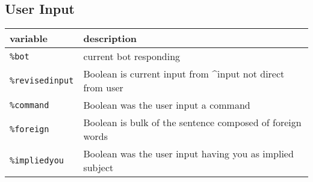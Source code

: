 \documentclass[]{article}
\begin{document}
\subsection{User Input}\label{user-input}

\begin{longtable}[]{@{}ll@{}}
\toprule
\begin{minipage}[b]{0.12\columnwidth}\raggedright\strut
variable\strut
\end{minipage} & \begin{minipage}[b]{0.10\columnwidth}\raggedright\strut
description\strut
\end{minipage}\tabularnewline
\midrule
\endhead
\begin{minipage}[t]{0.12\columnwidth}\raggedright\strut
\texttt{\%bot}\strut
\end{minipage} & \begin{minipage}[t]{0.10\columnwidth}\raggedright\strut
current bot responding\strut
\end{minipage}\tabularnewline
\begin{minipage}[t]{0.12\columnwidth}\raggedright\strut
\texttt{\%revisedinput}\strut
\end{minipage} & \begin{minipage}[t]{0.10\columnwidth}\raggedright\strut
Boolean is current input from \^{}input not direct from user\strut
\end{minipage}\tabularnewline
\begin{minipage}[t]{0.12\columnwidth}\raggedright\strut
\texttt{\%command}\strut
\end{minipage} & \begin{minipage}[t]{0.10\columnwidth}\raggedright\strut
Boolean was the user input a command\strut
\end{minipage}\tabularnewline
\begin{minipage}[t]{0.12\columnwidth}\raggedright\strut
\texttt{\%foreign}\strut
\end{minipage} & \begin{minipage}[t]{0.10\columnwidth}\raggedright\strut
Boolean is bulk of the sentence composed of foreign words\strut
\end{minipage}\tabularnewline
\begin{minipage}[t]{0.12\columnwidth}\raggedright\strut
\texttt{\%impliedyou}\strut
\end{minipage} & \begin{minipage}[t]{0.10\columnwidth}\raggedright\strut
Boolean was the user input having you as implied subject\strut

\end{minipage}
\end{longtable}
\end{document}
